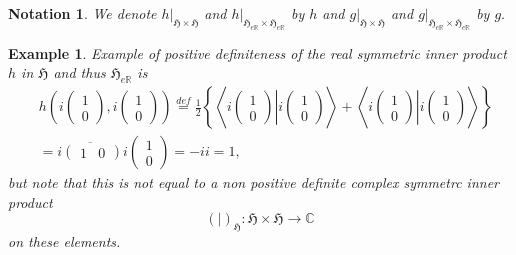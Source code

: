 \documentclass[aps,preprint]{revtex4}
\newtheorem{example}[theorem]{Example}
\newtheorem{notation}[theorem]{Notation}
\begin{document}
\begin{notation}
We denote $\left. h\right\vert _{\mathfrak{H\times H}}$ and $\left.
h\right\vert _{\mathfrak{H}_{e\mathbb{R}}\times \mathfrak{H}_{e\mathbb{R}}}$
by $h$ and $\left. g\right\vert _{\mathfrak{H\times H}}$ and $\left.
g\right\vert _{\mathfrak{H}_{e\mathbb{R}}\times \mathfrak{H}_{e\mathbb{R}}}$
by $g.$
\end{notation}

\begin{example}
Example of positive definiteness of the real symmetric inner product $h$ in $%
\mathfrak{H}$ and thus $\mathfrak{H}_{e\mathbb{R}}$ is 
\begin{align}
& h\left( i\left( 
\begin{array}{c}
1 \\ 
0%
\end{array}%
\right) ,i\left( 
\begin{array}{c}
1 \\ 
0%
\end{array}%
\right) \right) \overset{def}{=}\frac{1}{2}\left\{ \left\langle \left.
i\left( 
\begin{array}{c}
1 \\ 
0%
\end{array}%
\right) \right\vert i\left( 
\begin{array}{c}
1 \\ 
0%
\end{array}%
\right) \right\rangle +\left\langle \left. i\left( 
\begin{array}{c}
1 \\ 
0%
\end{array}%
\right) \right\vert i\left( 
\begin{array}{c}
1 \\ 
0%
\end{array}%
\right) \right\rangle \right\} \\
& =\overline{i\left( 
\begin{array}{cc}
1 & 0%
\end{array}%
\right) }i\left( 
\begin{array}{c}
1 \\ 
0%
\end{array}%
\right) =-ii=1,
\end{align}%
but note that this is not equal to a non positive definite complex symmetrc
inner product 
\begin{equation}
\left( \left. {}\right\vert \right) _{\mathfrak{H}}:\mathfrak{H\times H}%
\rightarrow \mathbb{C}
\end{equation}%
on these elements.
\end{example}
\end{document}
